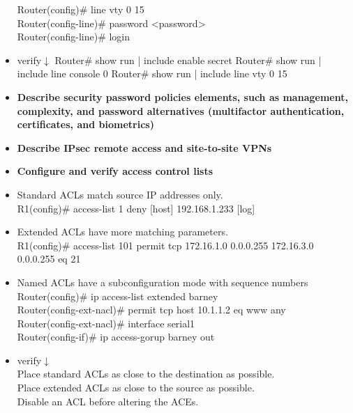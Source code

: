 \documentclass{article}
\begin{document}
\begin{itemize}
  		Router(config)\# line vty 0 15\\
  		Router(config-line)\# password \textless password\textgreater\\
  		Router(config-line)\# login
  	\item[] verify$\downarrow$
  		Router\# show run | include enable secret
  		Router\# show run | include line console 0
  		Router\# show run | include line vty 0 15
  \item \textbf{Describe security password policies elements, such as management, complexity, and password alternatives (multifactor authentication, certificates, and biometrics)}
  \item \textbf{Describe IPsec remote access and site-to-site VPNs}
  \item \textbf{Configure and verify access control lists}
  	\item[] Standard ACLs match source IP addresses only.\\
  		R1(config)\# access-list 1 deny [host] 192.168.1.233 [log]
  	\item[] Extended ACLs have more matching parameters.\\
  		R1(config)\# access-list 101 permit tcp 172.16.1.0 0.0.0.255 172.16.3.0 0.0.0.255 eq 21
  	\item[] Named ACLs have a subconfiguration mode with sequence numbers\\
  		Router(config)\# ip access-list extended barney\\
  		Router(config-ext-nacl)\# permit tcp host 10.1.1.2 eq www any\\
  		Router(config-ext-nacl)\# interface serial1\\
  		Router(config-if)\# ip access-gorup barney out
  	\item[] verify$\downarrow$\\
  		Place standard ACLs as close to the destination as possible.\\
  		Place extended ACLs as close to the source as possible.\\
  		Disable an ACL before altering the ACEs.
  		

\end{itemize}
\end{document}
